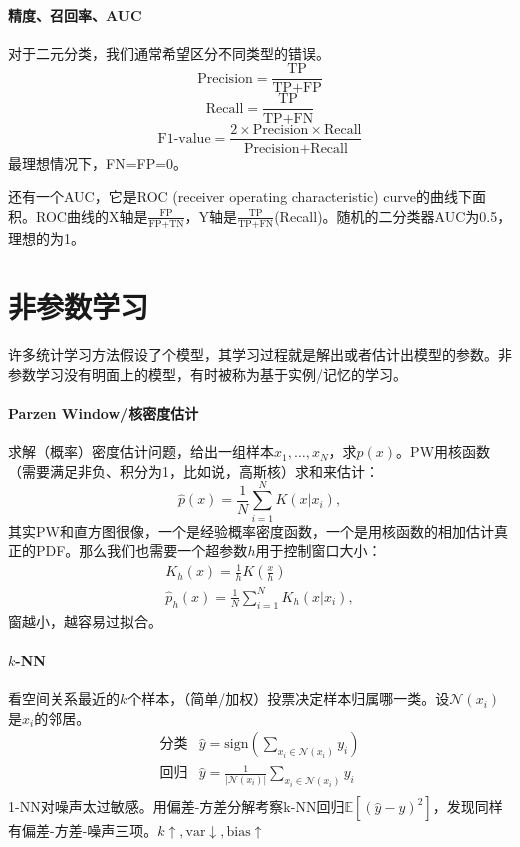 \paragraph{精度、召回率、AUC}
对于二元分类，我们通常希望区分不同类型的错误。
$$\text{Precision} = \frac{\text{TP}}{\text{TP} + \text{FP}}$$
$$\text{Recall} = \frac{\text{TP}}{\text{TP} + \text{FN}}$$
$$\text{F1-value} = \frac{2\times\text{Precision}\times\text{Recall}}{\text{Precision} + \text{Recall}}$$
最理想情况下，FN=FP=0。

还有一个AUC，它是ROC (receiver operating characteristic) curve的曲线下面积。ROC曲线的X轴是$\frac{\text{FP}}{\text{FP} + \text{TN}}$，Y轴是$\frac{\text{TP}}{\text{TP} + \text{FN}}$(Recall)。随机的二分类器AUC为0.5，理想的为1。

\section{非参数学习}
许多统计学习方法假设了个模型，其学习过程就是解出或者估计出模型的参数。非参数学习没有明面上的模型，有时被称为基于实例/记忆的学习。
\paragraph{Parzen Window/核密度估计}
求解（概率）密度估计问题，给出一组样本$x_1,\ldots,x_N$，求$p(x)$。PW用核函数（需要满足非负、积分为1，比如说，高斯核）求和来估计：
$$\hat{p}(x) = \frac{1}{N}\sum^N_{i=1}K(x|x_i),$$
其实PW和直方图很像，一个是经验概率密度函数，一个是用核函数的相加估计真正的PDF。那么我们也需要一个超参数$h$用于控制窗口大小：
$$
\begin{array}{l}
K_h(x) = \frac{1}{h}K(\frac{x}{h}) \\
\hat{p}_h(x) = \frac{1}{N}\sum^N_{i=1}K_h(x|x_i),
\end{array}
$$
窗越小，越容易过拟合。

\paragraph{$k$-NN}看空间关系最近的$k$个样本，（简单/加权）投票决定样本归属哪一类。设$\mathcal{N}(x_i)$是$x_i$的邻居。
$$
\begin{array}{ll}
\text{分类} & \hat{y} = \mathrm{sign}(\sum_{x_i \in \mathcal{N}(x_i)} y_i) \\
\text{回归} & \hat{y} = \frac{1}{|\mathcal{N}(x_i)|} \sum_{x_i \in \mathcal{N}(x_i)} y_i \\
\end{array}
$$
1-NN对噪声太过敏感。用偏差-方差分解考察k-NN回归$\mathbb{E}[(\hat{y} - y)^2]$，发现同样有偏差-方差-噪声三项。$k\uparrow,\text{var} \downarrow,\text{bias} \uparrow$

